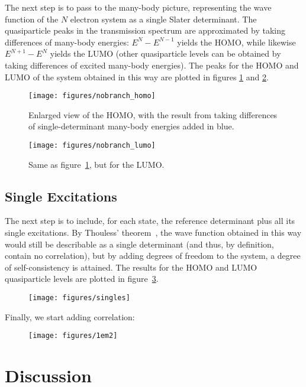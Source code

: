 The next step is to pass to the many-body picture, representing the wave
function of the $N$ electron system as a single Slater determinant. The
quasiparticle peaks in the transmission spectrum are approximated by taking
differences of many-body energies: $E^N - E^{N-1}$ yields the HOMO, while
likewise $E^{N+1} - E^N$ yields the LUMO (other quasiparticle levels can be
obtained by taking differences of excited many-body energies). The peaks for
the HOMO and LUMO of the system obtained in this way are plotted in figures
\ref{fig:nobranch_homo} and \ref{fig:nobranch_lumo}.

\begin{figure}
	\begin{center}
		\texttt{[image: figures/nobranch\_homo]}
	\end{center}
	\caption{Enlarged view of the HOMO, with the result from taking
	differences of single-determinant many-body energies added in blue.}
	\label{fig:nobranch_homo}
\end{figure}

\begin{figure}
	\begin{center}
		\texttt{[image: figures/nobranch\_lumo]}
	\end{center}
	\caption{Same as figure~\ref{fig:nobranch_homo}, but for the LUMO.}
	\label{fig:nobranch_lumo}
\end{figure}

\subsection{Single Excitations}
\label{subsec:singles}

The next step is to include, for each state, the reference determinant plus all
its single excitations. By Thouless' theorem~\cite{Thouless}, the wave function
obtained in this way would still be describable as a single determinant (and
thus, by definition, contain no correlation), but by adding degrees of freedom
to the system, a degree of self-consistency is attained. The results for the
HOMO and LUMO quasiparticle levels are plotted in figure~\ref{fig:singles}.

\begin{figure}
	\begin{center}
		\texttt{[image: figures/singles]}
	\end{center}
	\caption{}
	\label{fig:singles}
\end{figure}

Finally, we start adding correlation:

\begin{figure}
	\begin{center}
		\texttt{[image: figures/1em2]}
	\end{center}
	\caption{}
	\label{fig:1em2}
\end{figure}

\section{Discussion}
\label{sec:discussion}

